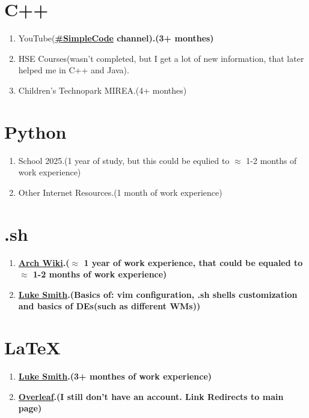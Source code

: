 \documentclass[a4paper, 12pt]{article}
\begin{document}
	\section*{C++}
	\begin{enumerate}
		\item YouTube(\bf \href{https://www.youtube.com/channel/UCtLKO1Cb2GVNrbU7Fi0pM0w}{\#SimpleCode} \rm channel).(3+ monthes)
		\item HSE Courses(wasn't completed, but I get a lot of new information, that later helped me in C++ and Java).
		\item Children's Technopark MIREA.(4+ monthes)
	\end{enumerate}
	
	\section*{Python}
	\begin{enumerate}
		\item School 2025.(1 year of study, but this could be equlied to $\approx$ 1-2 months of work experience)
		\item Other Internet Resources.(1 month of work experience)
	\end{enumerate}
	
	\section*{.sh}
	\begin{enumerate}
		\item \bf \href{https://wiki.archlinux.org/}{Arch Wiki}\rm.($\approx$ 1 year of work experience, that could be equaled to $\approx$ 1-2 months of work experience)
		\item \bf \href{https://www.youtube.com/channel/UC2eYFnH61tmytImy1mTYvhA}{Luke Smith}\rm.(Basics of: vim configuration, .sh shells customization and basics of DEs\cite{DE}(such as different WMs\cite{WM}))
	\end{enumerate}
	
	\section*{\LaTeX}
	\begin{enumerate}
		\item \bf \href{https://www.youtube.com/channel/UC2eYFnH61tmytImy1mTYvhA}{Luke Smith}\rm.(3+ monthes of work experience)
		\item \bf \href{https://www.overleaf.com/}{Overleaf}\rm.(I still don't have an account. Link Redirects to main page)
	\end{enumerate}
\end{document}
